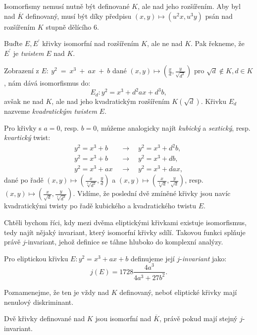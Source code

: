\documentclass[12pt]{report}
\begin{document}
Isomorfismy nemusí nutně být definované $K$, ale nad jeho rozšířením. Aby byl nad $\overline{K}$ definovaný, musí být díky předpisu $(x,y) \mapsto (u^2 x, u^3 y)$ psán nad rozšířením $K$ stupně dělícího $6$.
\begin{definice}
Buďte $E,E^\prime$ křivky isomorfní nad rozšířením $K$, ale ne nad $K$. Pak řekneme, že $E^\prime$ je \textit{twistem} $E$ nad $K$.
\end{definice}
Zobrazení z  $E:~y^2~=~x^3~+~ax~+~b$ dané $(x,y) \mapsto \left(\frac{x}{d}, \frac{y}{\sqrt{d^3}}\right) $ pro $\sqrt{d} \not \in K, d \in K$, nám dává isomorfismus do:
\begin{equation*}
E_d : y^2 = x^3 + d^2 a x + d^3 b,
\end{equation*}
avšak ne nad $K$, ale nad jeho kvadratickým rozšířením $K(\sqrt{d})$. Křivku $E_d$ nazveme \textit{kvadratickým twistem} $E$.

Pro křivky s $a=0$, resp. $b=0$, můžeme analogicky najít \textit{kubický} a \textit{sextický}, resp. \textit{kvartický} twist:
\begin{align*}
y^2 = x^3 + b \quad &\longrightarrow \quad y^2 = x^3 + d^2 b ,\\
y^2 = x^3 + b \quad &\longrightarrow \quad y^2 = x^3 + d b, \\
y^2 = x^3 +ax \; &\longrightarrow \quad y^2 = x^3 + d ax ,
\end{align*}
dané po řadě $(x,y)  \mapsto \left(\frac{x}{\sqrt[3]{d^2}}, \frac{y}{d}\right)$ a $(x,y)  \mapsto \left(\frac{x}{\sqrt[3]{d}}, \frac{y}{\sqrt{d}}\right)$, resp. $(x,y)  \mapsto \left(\frac{x}{\sqrt{d}}, \frac{y}{\sqrt[4]{d^3}}\right)$. Vidíme, že poslední dvě zmíněné křivky jsou navíc kvadratickými twisty po řadě kubického a kvadratického twistu $E$.

Chtěli bychom říci, kdy mezi dvěma eliptickými křivkami existuje isomorfismus, tedy najít nějaký invariant, který isomorfní křivky sdílí. Takovou funkci splňuje právě $j$-invariant, jehož definice se táhne hluboko do komplexní analýzy.

\begin{definice}
Pro eliptickou křivku $E: y^2 = x^3 + ax + b$ definujeme její $j$-\textit{invariant} jako:
\begin{equation*}
j(E) = 1728 \frac{4a^3}{4a^3+27b^2}.
\end{equation*}
\end{definice}
Poznamenejme, že ten je vždy nad $K$ definovaný, neboť eliptické křivky mají nenulový diskriminant.
\begin{veta}
Dvě křivky definované nad $K$ jsou isomorfní nad $\overline{K}$, právě pokud mají stejný $j$-invariant.
\end{veta}
\end{document}
